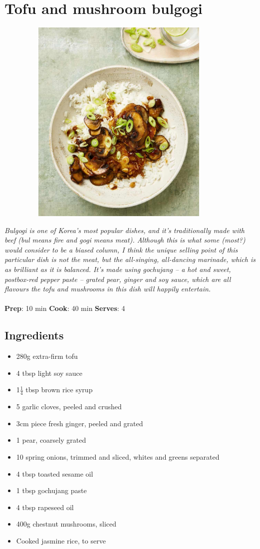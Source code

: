 \documentclass{book}
\begin{document}
\section{Tofu and mushroom bulgogi}
\begin{figure}
\centering\includegraphics[width=10cm,height=10cm,keepaspectratio]{Recipe_Pictures/Tofu_and_mushroom_bulgogi.png}
\end{figure}
\emph{Bulgogi is one of Korea’s most popular dishes, and it’s traditionally made with beef (bul means fire and gogi means meat). Although this is what some (most?) would consider to be a biased column, I think the unique selling point of this particular dish is not the meat, but the all-singing, all-dancing marinade, which is as brilliant as it is balanced. It’s made using gochujang – a hot and sweet, postbox-red pepper paste – grated pear, ginger and soy sauce, which are all flavours the tofu and mushrooms in this dish will happily entertain.}\\\\ 
\textbf{Prep}: 10 min
\textbf{Cook}: 40 min
\textbf{Serves}: 4
\subsection*{Ingredients}
\begin{itemize}
\item 280g extra-ﬁrm tofu
\item 4 tbsp light soy sauce
\item 1$\frac{1}{4}$ tbsp brown rice syrup
\item 5 garlic cloves, peeled and crushed
\item 3cm piece fresh ginger, peeled and grated
\item 1 pear, coarsely grated
\item 10 spring onions, trimmed and sliced, whites and greens separated
\item 4 tbsp toasted sesame oil
\item 1 tbsp gochujang paste
\item 4 tbsp rapeseed oil
\item 400g chestnut mushrooms, sliced
\item Cooked jasmine rice, to serve
\end{itemize}
\end{document}

